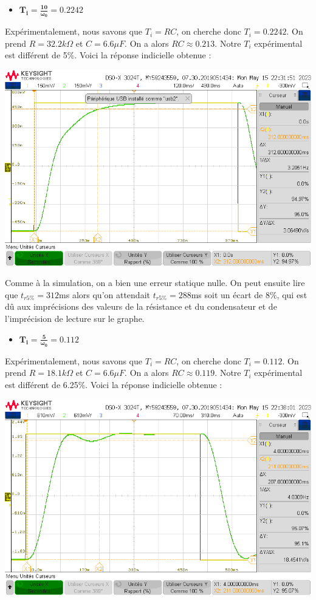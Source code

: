 \documentclass[12pt]{article}
\begin{document}
\begin{itemize}
    \item \large $\mathbf{T_i = \frac{10}{\omega_0} = 0.2242}$
\end{itemize}
Expérimentalement, nous savons que $T_i = RC$, on cherche donc $T_i = 0.2242$. On prend $R = 32.2 k\Omega$ et $C = 6.6 \mu F$. On a alors $RC \approx 0.213$. Notre $T_i$ expérimental est différent de 5$\%$.
Voici la réponse indicielle obtenue : 
\begin{center}
    \includegraphics[width = 16 cm]{TP3/Syst_2/I/tr5-syst2-ti=10surw1.png}
\end{center} 
Comme à la simulation, on a bien une erreur statique nulle. On peut ensuite lire que $t_{r5\%} = 312$ms alors qu'on attendait $t_{r5\%} = 288$ms soit un écart de 8$\%$, qui est dû aux imprécisions des valeurs de la résistance et du condensateur et de l'imprécision de lecture sur le graphe.
\begin{itemize}
    \item \large $\mathbf{T_i = \frac{5}{\omega_0} = 0.112}$
\end{itemize}
Expérimentalement, nous savons que $T_i = RC$, on cherche donc $T_i = 0.112$. On prend $R = 18.1 k\Omega$ et $C = 6.6 \mu F$. On a alors $RC \approx 0.119$. Notre $T_i$ expérimental est différent de 6.25$\%$.
Voici la réponse indicielle obtenue : 
\begin{center}
    \includegraphics[width = 16 cm]{TP3/Syst_2/I/tr5-syst2-ti=5surw0.png}
\end{center} 
\end{document}
